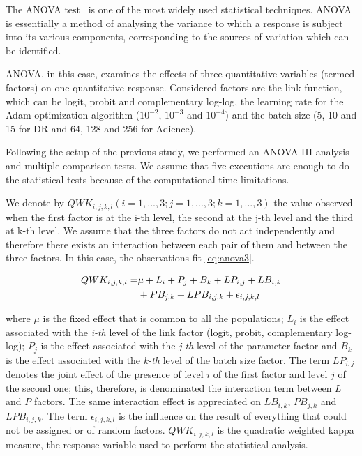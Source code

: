 \documentclass[journal]{IEEEtran}
\begin{document}
	The ANOVA test~\cite{miller1997beyond} is one of the most widely used statistical techniques. ANOVA is essentially a method of analysing the variance to which a response is subject into its various components, corresponding to the sources of variation which can be identified.
	
	ANOVA, in this case, examines the effects of three quantitative variables (termed factors) on one quantitative response. Considered factors are the link function, which can be logit, probit and complementary log-log, the learning rate for the Adam optimization algorithm ($10^{-2}$, $10^{-3}$ and $10^{-4}$) and the batch size (5, 10 and 15 for DR and 64, 128 and 256 for Adience).
	
	Following the setup of the previous study, we performed an ANOVA III analysis and multiple comparison tests. We assume that five executions are enough to do the statistical tests because of the computational time limitations.
	
	
	We denote by $QWK_{i,j,k,l}(i=1, ..., 3; j = 1, ..., 3; k = 1, ..., 3)$ the value observed when the first factor is at the i-th level, the second at the j-th level and the third at k-th level. We assume that the three factors do not act independently and therefore there exists an interaction between each pair of them and between the three factors. In this case, the observations fit \ref{eq:anova3}.
	
	\begin{equation}
	\begin{aligned}
	\footnotesize
	QWK_{i,j,k,l} = & \mu + L_i + P_j + B_k + LP_{i,j} + LB_{i,k} \\& + PB_{j,k} + LPB_{i,j,k} + \epsilon_{i,j,k,l}
	\label{eq:anova3}
	\end{aligned}
	\end{equation}
	
	where $\mu$ is the fixed effect that is common to all the populations; $L_i$ is the effect associated with the \textit{i-th} level of the link factor (logit, probit, complementary log-log); $P_j$ is the effect associated with the \textit{j-th} level of the parameter factor and $B_k$ is the effect associated with the \textit{k-th} level of the batch size factor. The term $LP_{i,j}$ denotes the joint effect of the presence of level $i$ of the first factor and level $j$ of the second one; this, therefore, is denominated the interaction term between $L$ and $P$ factors. The same interaction effect is appreciated on $LB_{i,k}$, $PB_{j,k}$ and $LPB_{i,j,k}$. The term $\epsilon_{i,j,k,l}$ is the influence on the result of everything that could not be assigned or of random factors. $QWK_{i,j,k,l}$ is the quadratic weighted kappa measure, the response variable used to perform the statistical analysis.
	
\end{document}
